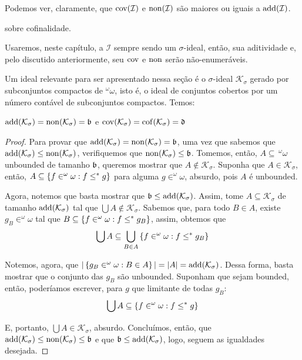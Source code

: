 Podemos ver, claramente, que $\operatorname{cov}(\mathcal I)$ e $\operatorname{non}(\mathcal I)$ são maiores ou iguais a $\operatorname{add}(\mathcal I)$.

\pending sobre cofinalidade. 

Usaremos, neste capítulo, a $\mathcal I$ sempre sendo um $\sigma$-ideal, então, sua aditividade e, pelo discutido anteriormente, seu $\operatorname{cov}$ e $\operatorname{non}$ serão não-enumeráveis. 

Um ideal relevante para ser apresentado nessa seção é o $\sigma$-ideal $\mathcal K_\sigma$ gerado por subconjuntos compactos de $^\omega \omega$, isto é, o ideal de conjuntos cobertos por um número contável de subconjuntos compactos. Temos:

\begin{theorem}
    $\operatorname{add}(\mathcal K_\sigma) = \operatorname{non}(\mathcal K_\sigma) = \mathfrak{b}$ e $\operatorname{cov}(\mathcal K_\sigma) = \operatorname{cof}(\mathcal K_\sigma) = \mathfrak{d}$
\end{theorem}
\begin{proof}
    \pending
    Para provar que $\operatorname{add}(\mathcal K_\sigma) = \operatorname{non}(\mathcal K_\sigma) = \mathfrak{b}$, uma vez que sabemos que $\operatorname{add}(\mathcal K_\sigma) \leq \operatorname{non}(\mathcal K_\sigma)$, verifiquemos que $\operatorname{non}(\mathcal K_\sigma) \leq \mathfrak{b}$. Tomemos, então, $A \subseteq\, ^\omega\omega$ unbounded de tamanho $\mathfrak{b}$, queremos mostrar que $A \notin \mathcal K_\sigma$. Suponha que $A\in \mathcal K_\sigma$, então, $A \subseteq \left\{ {f\in ^\omega\omega : f \leq^* g} \right\}$ para alguma $g\in ^\omega\omega$, absurdo, pois $A$ é unbounded. 

    Agora, notemos que basta mostrar que $\mathfrak{b} \leq \operatorname{add}(\mathcal K_\sigma)$. Assim, tome $A \subseteq \mathcal K_\sigma$ de tamanho $\operatorname{add}(\mathcal K_\sigma)$ tal que $\bigcup A \notin \mathcal K_\sigma$. Sabemos que, para todo $B\in A$, existe $g_B\in ^\omega\omega$ tal que $B \subseteq \left\{ f \in ^\omega\omega : f\leq^* g_B \right\}$, assim, obtemos que 
    $$\bigcup A \subseteq \bigcup_{B\in A}\left\{ f \in ^\omega\omega : f\leq^* g_B \right\}$$

    Notemos, agora, que $|\left\{ g_B\in ^\omega\omega : B\in A \right\}| = |A| = \operatorname{add}(\mathcal K_\sigma)$. Dessa forma, basta mostrar que o conjunto das $g_B$ são unbounded. Suponham que sejam bounded, então, poderíamos escrever, para $g$ que limitante de todas $g_B$: 
    $$\bigcup A \subseteq \left\{ f \in ^\omega\omega : f\leq^* g \right\} $$

    E, portanto, $\bigcup A \in \mathcal K_\sigma$, absurdo. Concluímos, então, que $\operatorname{add}(\mathcal K_\sigma) \leq \operatorname{non}(\mathcal K_\sigma) \leq \mathfrak{b}$ e que $\mathfrak{b} \leq \operatorname{add}(\mathcal K_\sigma)$, logo, seguem as igualdades desejada.
\end{proof}

